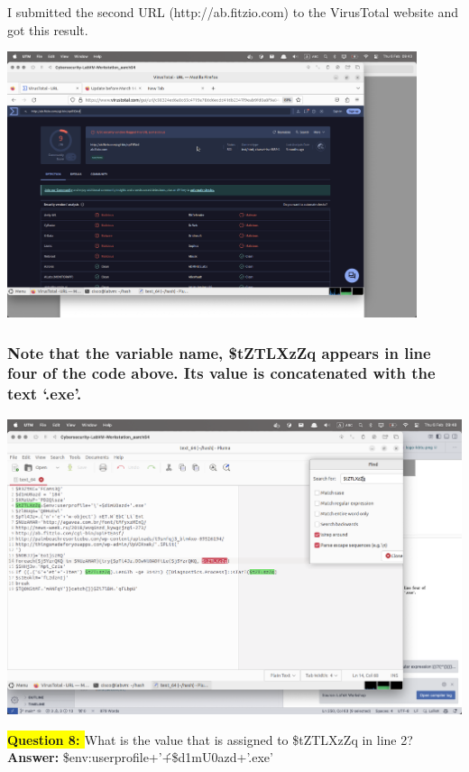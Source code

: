 \documentclass{article}
\begin{document}
I submitted the second URL (http://ab.fitzio.com) to the VirusTotal website and got this result.

\includegraphics[width=0.9\textwidth]{16.png}

\newpage

\subsubsection*{Note that the variable name, \$tZTLXzZq appears in line four of the code above. Its value is concatenated with the text ‘.exe’.}

\vspace{1\baselineskip}

\includegraphics[width=1\textwidth]{17.png}

\vspace{1\baselineskip}

\textbf{\colorbox{yellow}{Question 8: }} What is the value that is assigned to \$tZTLXzZq in line 2? \\
\textbf{Answer: } \$env:userprofile+'\'+\$d1mU0azd+'.exe' \\
\end{document}
